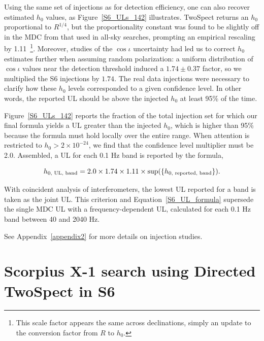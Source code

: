 Using the same set of injections as for detection efficiency, one can also recover estimated $h_0$ values, as Figure~\ref{S6_ULs_142} illustrates.
TwoSpect returns an $h_0$ proportional to $R^{1/4}$, but the proportionality constant was found to be slightly off in the MDC from that used in all-sky searches, prompting an empirical rescaling by 1.11~\footnote{This scale factor appears the same across declinations, simply an update to the conversion factor from $R$ to $h_0$.}.
Moreover, studies of the $\cos \iota$ uncertainty had led us to correct $h_0$ estimates further when assuming random polarization: a uniform distribution of $\cos \iota$ values near the detection threshold induced a $1.74 \pm 0.37$ factor, so we multiplied the S6 injections by $1.74$.
The real data injections were necessary to clarify how these $h_0$ levels corresponded to a given confidence level. 
In other words, the reported UL should be above the injected $h_0$ at least 95\% of the time.

Figure~\ref{S6_ULs_142} reports the fraction of the total injection set for which our final formula yields a UL greater than the injected $h_0$, which is higher than 95\% because the formula must hold locally over the entire range.
When attention is restricted to $h_0 > 2\times10^{-24}$, we find that the confidence level multiplier must be 2.0.
Assembled, a UL for each 0.1 Hz band is reported by the formula,

\begin{equation}
h_{0,\textup{ UL, band}} = 2.0 \times 1.74 \times 1.11 \times \textup{sup}(\{h_{0, \textup{ reported, band}}\}).
\label{S6_UL_formula}
\end{equation}

\noindent With coincident analysis of interferometers, the lowest UL reported for a band is taken as the joint UL.
This criterion and Equation~\ref{S6_UL_formula} supersede the single MDC UL with a frequency-dependent UL, calculated for each 0.1 Hz band between 40 and 2040 Hz.

See Appendix~\ref{appendix2} for more details on injection studies.


        \section{Scorpius X-1 search using Directed TwoSpect in S6}
        \label{directed_results}
 
